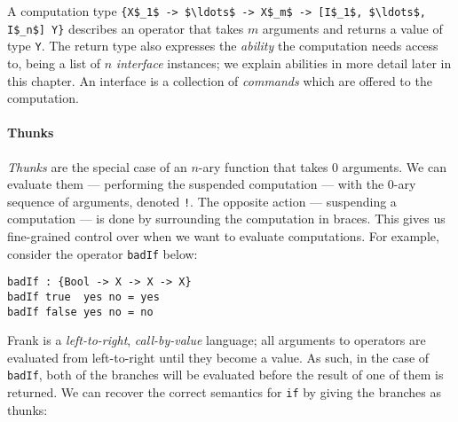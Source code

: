\documentclass[msc,deptreport,cs]{infthesis} %
\newcommand{\code}[1]{\lstinline{#1}}
\newcommand{\todo}[1]
           {{\par\noindent\small\color{RoyalPurple}
  \framebox{\parbox{\dimexpr\linewidth-2\fboxsep-2\fboxrule}
    {\textbf{TODO:} #1}}}}
\begin{document}
A computation type
%
\lstinline[mathescape]!{X$_1$ -> $\ldots$ -> X$_m$ -> [I$_1$, $\ldots$, I$_n$] Y}!
%
describes an operator that takes $m$ arguments and returns a value of type
\code{Y}. The return type also expresses the \emph{ability} the computation
needs access to, being a list of $n$ \emph{interface} instances; we explain
abilities in more detail later in this chapter. An interface is a collection of
\emph{commands} which are offered to the computation.




\paragraph*{Thunks}

\emph{Thunks} are the special case of an $n$-ary function that takes 0
arguments. We can evaluate them --- performing the suspended computation ---
with the 0-ary sequence of arguments, denoted \code{!}.
%
The opposite action --- suspending a computation --- is done by surrounding the
computation in braces.
%
This gives us fine-grained control over when we want to evaluate computations.
For example, consider the operator \code{badIf} below:


\begin{lstlisting}
badIf : {Bool -> X -> X -> X}
badIf true  yes no = yes
badIf false yes no = no
\end{lstlisting}

\noindent Frank is a \emph{left-to-right}, \emph{call-by-value} language; all
arguments to operators are evaluated from left-to-right until they become a
value. As such, in the case of \code{badIf}, both of the branches will be
evaluated before the result of one of them is returned. We can recover the
correct semantics for \code{if} by giving the branches as thunks:
\end{document}
